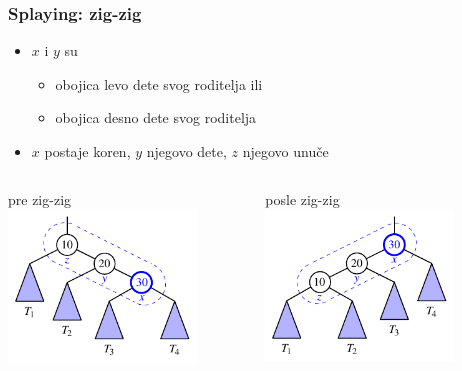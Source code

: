 \documentclass[compress,aspectratio=169]{beamer}
\begin{document}
\begin{frame}[fragile]
  \frametitle{Splaying: zig-zig}
  \begin{itemize}
    \item $x$ i $y$ su  
    \begin{itemize}
      \item obojica levo dete svog roditelja ili
      \item obojica desno dete svog roditelja
    \end{itemize}
    \item $x$ postaje koren, $y$ njegovo dete, $z$ njegovo unuče
  \end{itemize}
  \begin{columns}
    \begin{column}[t]{6cm}
      \begin{center}
        pre zig-zig 
        \includegraphics[width=5cm]{asp-11-pic18a.pdf}
      \end{center}
    \end{column}  
    \begin{column}[t]{6cm}
      \begin{center}
        posle zig-zig
        \includegraphics[width=5cm]{asp-11-pic18b.pdf}
      \end{center}
    \end{column}  
  \end{columns}
\end{frame}
\end{document}
